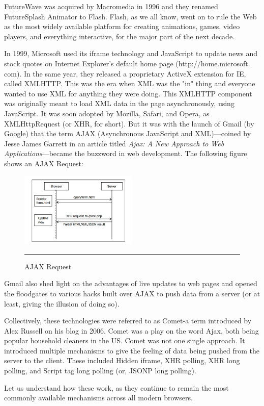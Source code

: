 FutureWave was acquired by Macromedia in 1996 and they renamed FutureSplash
Animator to Flash. Flash, as we all know, went on to rule the Web as the most widely
available platform for creating animations, games, video players, and everything
interactive, for the major part of the next decade.

In 1999, Microsoft used its iframe technology and JavaScript to update news and
stock quotes on Internet Explorer's default home page (http://home.microsoft.
com). In the same year, they released a proprietary ActiveX extension for IE, called
XMLHTTP. This was the era when XML was the "in" thing and everyone wanted to
use XML for anything they were doing. This XMLHTTP component was originally
meant to load XML data in the page asynchronously, using JavaScript. It was soon
adopted by Mozilla, Safari, and Opera, as XMLHttpRequest (or XHR, for short).
But it was with the launch of Gmail (by Google) that the term AJAX (Asynchronous
JavaScript and XML)—coined by Jesse James Garrett in an article titled \textit{Ajax: A
New Approach to Web Applications}—became the buzzword in web development. The
following figure shows an AJAX Request:
\begin{figure}[h!]
  \centering
    \includegraphics[width=0.5\textwidth]{./Pictures/ajax.jpg}
  \rule{0.5\textwidth}{1pt}
  \caption{AJAX Request}
\end{figure}
Gmail also shed light on the advantages of live updates to web pages and opened the
floodgates to various hacks built over AJAX to push data from a server (or at least,
giving the illusion of doing so).

Collectively, these technologies were referred to as Comet-a term introduced by Alex
Russell on his blog in 2006. Comet was a play on the word Ajax, both being popular
household cleaners in the US. Comet was not one single approach. It introduced
multiple mechanisms to give the feeling of data being pushed from the server to the
client. These included Hidden iframe, XHR polling, XHR long polling, and Script tag
long polling (or, JSONP long polling).

Let us understand how these work, as they continue to remain the most commonly
available mechanisms across all modern browsers.

